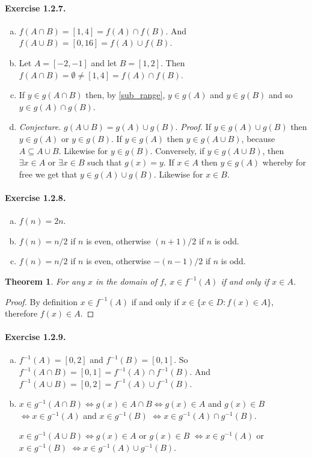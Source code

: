 \documentclass{article}
\newtheorem{theorem}{Theorem}[section]
\newcommand{\inv}{^{-1}}
\begin{document}
\paragraph{Exercise 1.2.7.}
\begin{enumerate}[(a)]
    \item $f(A\cap B)=[1,4]=f(A)\cap f(B)$. And $f(A\cup B)=[0,16]=f(A)\cup f(B)$.
    \item Let $A=[-2,-1]$ and let $B=[1,2]$. Then $f(A\cap B)=\emptyset \neq [1,4] = f(A)\cap f(B)$.
    \item If $y\in g(A\cap B)$ then, by \autoref{sub_range}, $y\in g(A)$ and $y\in g(B)$ and so $y\in g(A) \cap g(B)$.
    \item \textit{Conjecture.} $g(A\cup B) = g(A) \cup g(B)$. \textit{Proof.} If $y\in g(A) \cup g(B)$ then $y\in g(A)$ or $y\in g(B)$. If $y\in g(A)$ then $y\in g(A\cup B)$, because $A\subseteq A\cup B$. Likewise for $y\in g(B)$. Conversely, if $y\in g(A\cup B)$, then $\exists x \in A$ or $\exists x \in B$ such that $g(x)=y$. If $x\in A$ then $y \in g(A)$ whereby for free we get that $y\in g(A) \cup g(B)$. Likewise for $x \in B$.
\end{enumerate}

\paragraph{Exercise 1.2.8.}
\begin{enumerate}[(a)]
    \item $f(n)=2n$.
    \item $f(n) = n/2$ if $n$ is even, otherwise $(n+1)/2$ if $n$ is odd.
    \item $f(n) = n/2$ if $n$ is even, otherwise $-(n-1)/2$ if $n$ is odd.
\end{enumerate}

\begin{theorem}
    For any $x$ in the domain of $f$, $x\in f^{-1}(A)$ if and only if $x\in A$.
\end{theorem}
\begin{proof}
    By definition $x\in f^{-1}(A)$ if and only if $x\in \{x\in D: f(x) \in A\}$, therefore $f(x)\in A$.
\end{proof}

\paragraph{Exercise 1.2.9.}
\begin{enumerate}[(a)]
    \item $f^{-1}(A) = [0,2]$ and $f^{-1}(B) = [0,1]$. So $f^{-1}(A\cap B) = [0,1] = f^{-1}(A) \cap f^{-1}(B)$. And $f^{-1}(A\cup B) = [0,2] = f^{-1}(A) \cup f^{-1}(B)$.
    \item $x\in g\inv(A\cap B) \iff g(x) \in A\cap B \iff g(x) \in A$ and $g(x) \in B$ $\iff x\in g\inv(A)$ and $x \in g\inv(B)$ $\iff x\in g\inv(A)\cap g\inv(B)$.

    $x\in g\inv(A\cup B) \iff g(x)\in A$ or $g(x) \in B$ $\iff x\in g\inv(A)$ or $x\in g\inv(B)$ $\iff x\in g\inv(A) \cup g\inv(B)$.
\end{enumerate}
\end{document}
